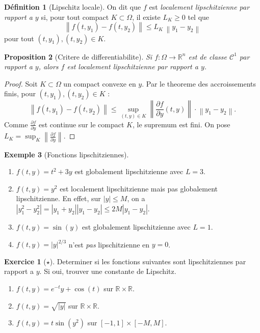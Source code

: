\documentclass[12pt,a4paper,openany]{book}
\theoremstyle{definition}
\newtheorem{definition}{Définition}[chapter]
\newtheorem{exemple}[definition]{Exemple}
\newtheorem{exercice}{Exercice}[chapter]
\theoremstyle{plain}
\newtheorem{proposition}[definition]{Proposition}
\theoremstyle{remark}
\newcommand{\R}{\mathbb{R}}
\newcommand{\abs}[1]{\left|#1\right|}
\newcommand{\norm}[1]{\left\|#1\right\|}
\begin{document}
\begin{definition}[Lipschitz locale]\label{def:lipschitz-locale}
On dit que $f$ est \emph{localement lipschitzienne par rapport a $y$} si, pour tout compact $K \subset \Omega$, il existe $L_K \geq 0$ tel que
\[
  \norm{f(t, y_1) - f(t, y_2)} \leq L_K \, \norm{y_1 - y_2}
\]
pour tout $(t, y_1), (t, y_2) \in K$.
\end{definition}

\begin{proposition}[Critere de differentiabilite]\label{prop:C1-lipschitz}
Si $f : \Omega \to \R^n$ est de classe $\mathcal{C}^1$ par rapport a $y$, alors $f$ est localement lipschitzienne par rapport a $y$.
\end{proposition}

\begin{proof}
Soit $K \subset \Omega$ un compact convexe en $y$. Par le theoreme des accroissements finis, pour $(t, y_1), (t, y_2) \in K$ :
\[
  \norm{f(t, y_1) - f(t, y_2)} \leq \sup_{(t,y) \in K} \norm{\frac{\partial f}{\partial y}(t, y)} \cdot \norm{y_1 - y_2}.
\]
Comme $\frac{\partial f}{\partial y}$ est continue sur le compact $K$, le supremum est fini. On pose $L_K = \sup_{K} \norm{\frac{\partial f}{\partial y}}$.
\end{proof}

\begin{exemple}[Fonctions lipschitziennes]\label{ex:lipschitz-exemples}
\begin{enumerate}[label=(\alph*)]
  \item $f(t, y) = t^2 + 3y$ est globalement lipschitzienne avec $L = 3$.
  \item $f(t, y) = y^2$ est localement lipschitzienne mais pas globalement lipschitzienne. En effet, sur $\abs{y} \leq M$, on a $\abs{y_1^2 - y_2^2} = \abs{y_1 + y_2}\abs{y_1 - y_2} \leq 2M\abs{y_1 - y_2}$.
  \item $f(t, y) = \sin(y)$ est globalement lipschitzienne avec $L = 1$.
  \item $f(t, y) = \abs{y}^{2/3}$ n'est \emph{pas} lipschitzienne en $y = 0$.
\end{enumerate}
\end{exemple}

\begin{exercice}[$\star$]\label{exo:verif-lipschitz}
Determiner si les fonctions suivantes sont lipschitziennes par rapport a $y$. Si oui, trouver une constante de Lipschitz.
\begin{enumerate}[label=(\alph*)]
  \item $f(t, y) = e^{-t} y + \cos(t)$ sur $\R \times \R$.
  \item $f(t, y) = \sqrt{\abs{y}}$ sur $\R \times \R$.
  \item $f(t, y) = t \sin(y^2)$ sur $[-1,1] \times [-M, M]$.
\end{enumerate}
\end{exercice}
\end{document}
